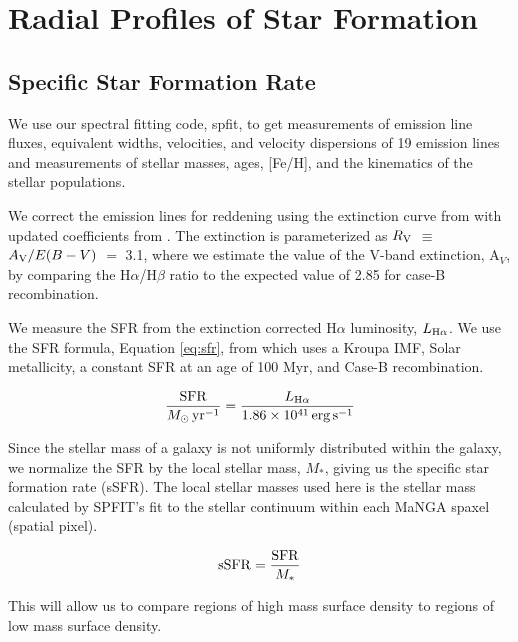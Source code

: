\documentclass[iop,revtex4,twocolumn,apj,numberedappendix,appendixfloats]{emulateapj}
\begin{document}
\section{Radial Profiles of Star Formation}\label{sec:analysis}

\subsection{Specific Star Formation Rate}

We use our spectral fitting code, {\sc spfit}, to get measurements of emission line fluxes, equivalent widths, velocities, and velocity dispersions of 19 emission lines and measurements of stellar masses, ages, [Fe/H], and the kinematics of the stellar populations. 

We correct the emission lines for reddening using the extinction curve from \citet{Cardelli:1989} with updated coefficients from \citet{ODonnell:1994}. The extinction is parameterized as $R_{\rm V}$ $\equiv$ $A_{\rm V}/E(B-V)$ $=$ 3.1, where we estimate the value of the V-band extinction, A$_V$, by comparing the H$\alpha$/H$\beta$ ratio to the expected value of 2.85 for case-B recombination. 

We measure the SFR from the extinction corrected H$\alpha$ luminosity, $L_{{\rm H}\alpha}$.  We use the SFR formula, Equation \ref{eq:sfr}, from \citet{Murphy:2011} which uses a Kroupa IMF, Solar metallicity, a constant SFR at an age of 100 Myr, and Case-B recombination. 

\begin{equation}\label{eq:sfr}
\frac{\rm{SFR}}{M_{\odot} \, \rm{yr^{-1}}} = \frac{L_{\rm H\alpha}}{1.86 \times 10^{41}\, \rm{erg\,s}^{-1}}
\end{equation}

Since the stellar mass of a galaxy is not uniformly distributed within the galaxy, we normalize the SFR by the local stellar mass, $M_*$, giving us the specific star formation rate (sSFR). The local stellar masses used here is the stellar mass calculated by {\sc SPFIT}'s fit to the stellar continuum within each MaNGA spaxel (spatial pixel).

\begin{equation}
{\rm sSFR} = \frac{\rm SFR}{M_*}
\end{equation}

This will allow us to compare regions of high mass surface density to regions of low mass surface density. 
\end{document}
